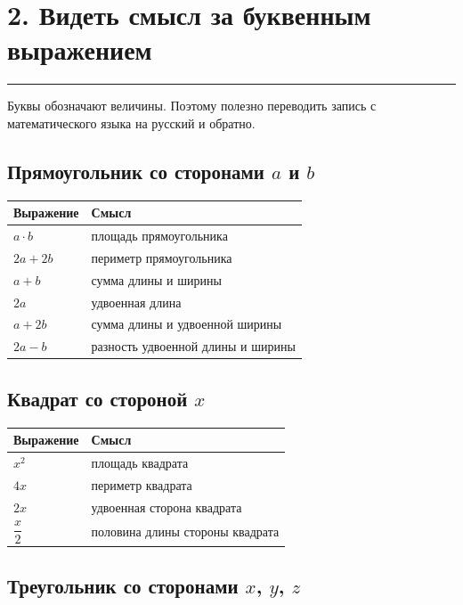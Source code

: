 \documentclass[a4paper,12pt]{article}
\newcommand{\sectionline}{\vspace{-0.35em}\noindent\textcolor{accent}{\rule{\linewidth}{0.6pt}}\vspace{0.35em}}
\begin{document}
\clearpage

\section*{2. Видеть смысл за буквенным выражением}
\sectionline

Буквы обозначают величины. Поэтому полезно переводить запись
с математического языка на русский и обратно.

\subsection*{Прямоугольник со сторонами $a$ и $b$}

\begin{center}
\begin{tabularx}{\linewidth}{@{}>{\bfseries}l X@{}}
\toprule
Выражение & Смысл \\
\midrule
$a\cdot b$ & площадь прямоугольника \\
$2a+2b$ & периметр прямоугольника \\
$a+b$ & сумма длины и ширины \\
$2a$ & удвоенная длина \\
$a+2b$ & сумма длины и удвоенной ширины \\
$2a-b$ & разность удвоенной длины и ширины \\
\bottomrule
\end{tabularx}
\end{center}

\subsection*{Квадрат со стороной $x$}

\begin{center}
\begin{tabularx}{\linewidth}{@{}>{\bfseries}l X@{}}
\toprule
Выражение & Смысл \\
\midrule
$x^2$ & площадь квадрата \\
$4x$ & периметр квадрата \\
$2x$ & удвоенная сторона квадрата \\
$\dfrac{x}{2}$ & половина длины стороны квадрата \\
\bottomrule
\end{tabularx}
\end{center}

\subsection*{Треугольник со сторонами $x$, $y$, $z$}
\end{document}
